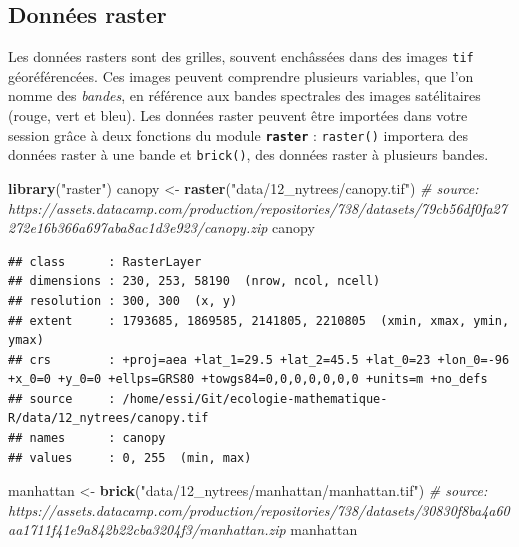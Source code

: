 \documentclass[]{book}
\newenvironment{Shaded}{\begin{snugshade}}{\end{snugshade}}
\newcommand{\CommentTok}[1]{\textcolor[rgb]{0.56,0.35,0.01}{\textit{#1}}}
\newcommand{\KeywordTok}[1]{\textcolor[rgb]{0.13,0.29,0.53}{\textbf{#1}}}
\newcommand{\NormalTok}[1]{#1}
\newcommand{\StringTok}[1]{\textcolor[rgb]{0.31,0.60,0.02}{#1}}
\begin{document}
\hypertarget{donnuxe9es-raster}{%
\subsection{Données raster}\label{donnuxe9es-raster}}

Les données rasters sont des grilles, souvent enchâssées dans des images
\texttt{tif} géoréférencées. Ces images peuvent comprendre plusieurs
variables, que l'on nomme des \emph{bandes}, en référence aux bandes
spectrales des images satélitaires (rouge, vert et bleu). Les données
raster peuvent être importées dans votre session grâce à deux fonctions
du module \textbf{\texttt{raster}} : \texttt{raster()} importera des
données raster à une bande et \texttt{brick()}, des données raster à
plusieurs bandes.

\begin{Shaded}
\begin{Highlighting}[]
\KeywordTok{library}\NormalTok{(}\StringTok{"raster"}\NormalTok{)}
\NormalTok{canopy <-}\StringTok{ }\KeywordTok{raster}\NormalTok{(}\StringTok{"data/12_nytrees/canopy.tif"}\NormalTok{) }\CommentTok{# source: https://assets.datacamp.com/production/repositories/738/datasets/79cb56df0fa27272e16b366a697aba8ac1d3e923/canopy.zip}
\NormalTok{canopy}
\end{Highlighting}
\end{Shaded}

\begin{verbatim}
## class      : RasterLayer 
## dimensions : 230, 253, 58190  (nrow, ncol, ncell)
## resolution : 300, 300  (x, y)
## extent     : 1793685, 1869585, 2141805, 2210805  (xmin, xmax, ymin, ymax)
## crs        : +proj=aea +lat_1=29.5 +lat_2=45.5 +lat_0=23 +lon_0=-96 +x_0=0 +y_0=0 +ellps=GRS80 +towgs84=0,0,0,0,0,0,0 +units=m +no_defs 
## source     : /home/essi/Git/ecologie-mathematique-R/data/12_nytrees/canopy.tif 
## names      : canopy 
## values     : 0, 255  (min, max)
\end{verbatim}

\begin{Shaded}
\begin{Highlighting}[]
\NormalTok{manhattan <-}\StringTok{ }\KeywordTok{brick}\NormalTok{(}\StringTok{"data/12_nytrees/manhattan/manhattan.tif"}\NormalTok{) }\CommentTok{# source: https://assets.datacamp.com/production/repositories/738/datasets/30830f8ba4a60aa1711f41e9a842b22cba3204f3/manhattan.zip}
\NormalTok{manhattan}
\end{Highlighting}
\end{Shaded}
\end{document}
